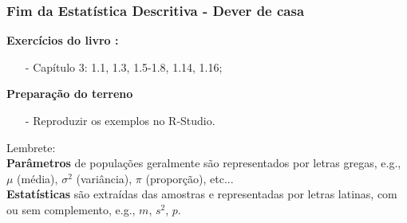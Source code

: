 \documentclass[graphics,14pt]{beamer}
\begin{document}
\begin{frame}[t,fragile=singleslide]
\frametitle{Fim da Estatística Descritiva - Dever de casa}
	\textbf{Exercícios do livro \cite{Agresti2018}:}
	\begin{itemize}
		\item[-] Capítulo 3: 1.1, 1.3, 1.5-1.8, 1.14, 1.16;
	\end{itemize}
	\textbf{Preparação do terreno}
	\begin{itemize}
		\item[-] Reproduzir os exemplos no R-Studio.
	\end{itemize}	
	\vspace{1cm}
	Lembrete:\\
	\textbf{Parâmetros} de populações geralmente são representados por letras gregas, e.g., $\mu$ (média), $\sigma^2$ (variância), $\pi$ (proporção), etc...\\
	\textbf{Estatísticas} são extraídas das amostras e representadas por letras latinas, com ou sem complemento, e.g., $m$, $s^2$, $p$.\\
\end{frame}

\end{document}
